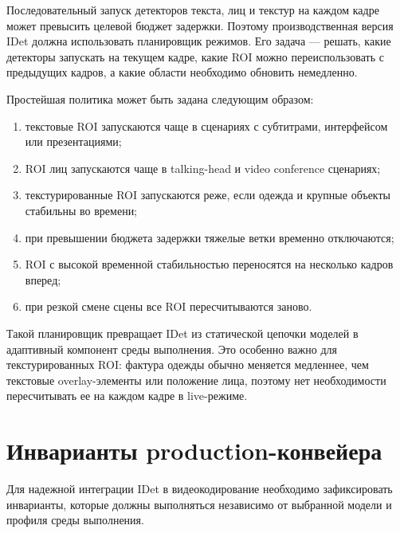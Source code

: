 \documentclass[12pt,a4paper,oneside,openany]{report}
\begin{document}
Последовательный запуск детекторов текста, лиц и текстур на каждом кадре может превысить целевой
бюджет задержки. Поэтому производственная версия IDet должна использовать планировщик режимов.
Его задача --- решать, какие детекторы запускать на текущем кадре, какие ROI можно
переиспользовать с предыдущих кадров, а какие области необходимо обновить немедленно.

Простейшая политика может быть задана следующим образом:
\begin{enumerate}[label=\arabic*)]
  \item текстовые ROI запускаются чаще в сценариях с субтитрами, интерфейсом или презентациями;
  \item ROI лиц запускаются чаще в talking-head и video conference сценариях;
  \item текстурированные ROI запускаются реже, если одежда и крупные объекты стабильны во времени;
  \item при превышении бюджета задержки тяжелые ветки временно отключаются;
  \item ROI с высокой временной стабильностью переносятся на несколько кадров вперед;
  \item при резкой смене сцены все ROI пересчитываются заново.
\end{enumerate}

Такой планировщик превращает IDet из статической цепочки моделей в адаптивный компонент среды
выполнения. Это особенно важно для текстурированных ROI: фактура одежды обычно меняется
медленнее, чем текстовые overlay-элементы или положение лица, поэтому нет необходимости
пересчитывать ее на каждом кадре в live-режиме.


\section{Инварианты production-конвейера}

Для надежной интеграции IDet в видеокодирование необходимо зафиксировать инварианты, которые
должны выполняться независимо от выбранной модели и профиля среды выполнения.
\end{document}

